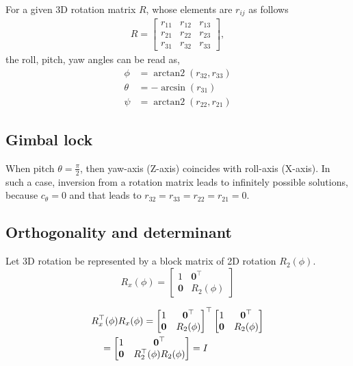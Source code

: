 \documentclass[twocolumn]{article}
\DeclareMathOperator{\atantwo}{arctan2}
\begin{document}
For a  given 3D  rotation matrix $R$, whose   elements  are   $r_{ij}$ as follows
%
\begin{align}
R =  \begin{bmatrix}
  r_{11}  &   r_{12} &   r_{13}   \\
  r_{21}  &   r_{22} &   r_{23}   \\
  r_{31}  &   r_{32} &   r_{33} 
  \end{bmatrix},
\end{align}
%
the roll,  pitch, yaw  angles can  be read as,
\begin{align}
  \phi &= \atantwo(r_{32},   r_{33}) \\
  \theta &= -\arcsin(r_{31}) \\
  \psi &= \atantwo(r_{22}, r_{21})
  \end{align}

\subsection{Gimbal lock}

When pitch $\theta  = \frac{\pi}{2}$, then yaw-axis (Z-axis) coincides with
roll-axis (X-axis). In such a  case,  inversion from a rotation matrix leads to
infinitely possible solutions, because  $c_\theta = 0$ and   that leads  to
$r_{32} = r_{33} =  r_{22} = r_{21} = 0$.

\subsection{Orthogonality and determinant}
Let 3D rotation  be represented  by a block matrix of 2D rotation $R_2(\phi)$.
\[
  R_x(\phi) = \begin{bmatrix}
          1  &   \boldsymbol{0}^\top   \\
               \boldsymbol{0}  &   R_2(\phi)
          \end{bmatrix}
\]

\begin{align}
  &R_x^\top(\phi) R_x(\phi) =  \begin{bmatrix}
    1  &   \boldsymbol{0}^\top   \\
    \boldsymbol{0}  &   R_2(\phi)
  \end{bmatrix}^\top
  \begin{bmatrix}
    1  &   \boldsymbol{0}^\top   \\
    \boldsymbol{0}  &   R_2(\phi)
  \end{bmatrix}
 \notag\\
  &\quad
 =
  \begin{bmatrix}
    1  &   \boldsymbol{0}^\top   \\
    \boldsymbol{0}  &   R_2^\top(\phi)R_2(\phi)
  \end{bmatrix}
                      = I
\end{align}
\end{document}
